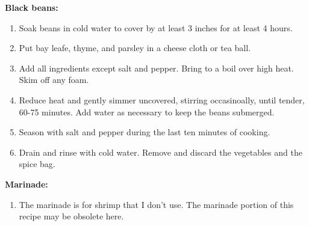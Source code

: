 \prep{}


\textbf{Black beans:}

\begin{ingredients}
\end{ingredients}


\begin{recipe}
  \begin{enumerate}

  \item Soak beans in cold water to cover by at least 3 inches for at
    least 4 hours.

  \item Put bay leafe, thyme, and parsley in a cheese cloth or tea ball.

  \item Add all ingredients except salt and pepper.  Bring to a boil
    over high heat.  Skim off any foam.

  \item Reduce heat and gently simmer uncovered, stirring
    occasinoally, until tender, 60-75 minutes.  Add water as necessary
    to keep the beans submerged.

  \item Season with salt and pepper during the last ten minutes of
    cooking.

  \item Drain and rinse with cold water.  Remove and discard the
    vegetables and the spice bag.

  \end{enumerate}
\end{recipe}


\textbf{Marinade:}

\begin{ingredients}
\end{ingredients}


\begin{recipe}
  \begin{enumerate}

  \item The marinade is for shrimp that I don't use.  The marinade
    portion of this recipe may be obsolete here.

  \end{enumerate}
\end{recipe}


